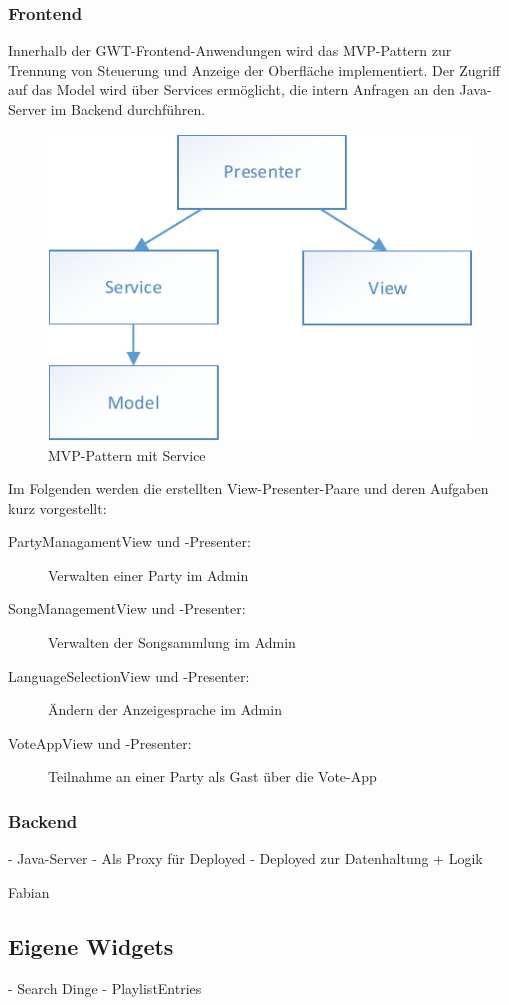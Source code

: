 \subsubsection{Frontend}
Innerhalb der GWT-Frontend-Anwendungen wird das MVP-Pattern zur Trennung von Steuerung und Anzeige
der Oberfläche implementiert. Der Zugriff auf das Model wird über Services ermöglicht, die intern
Anfragen an den Java-Server im Backend durchführen.

\begin{figure}[tbh]
\centering
\includegraphics[width=0.6\linewidth]{Bilder/MVP-mit-Service}
\caption{MVP-Pattern mit Service}
\label{fig:MVP-mit-Service}
\end{figure}

Im Folgenden werden die erstellten View-Presenter-Paare und deren Aufgaben kurz vorgestellt:
\begin{description}
	\item[PartyManagamentView und -Presenter:] Verwalten einer Party im Admin
	\item[SongManagementView und -Presenter:] Verwalten der Songsammlung im Admin
	\item[LanguageSelectionView und -Presenter:] Ändern der Anzeigesprache im Admin
	\item[VoteAppView und -Presenter:] Teilnahme an einer Party als Gast über die Vote-App
\end{description}

\subsubsection{Backend}
- Java-Server
- Als Proxy für Deployed
- Deployed zur Datenhaltung + Logik

Fabian

\subsection{Eigene Widgets}
- Search Dinge
- PlaylistEntries

